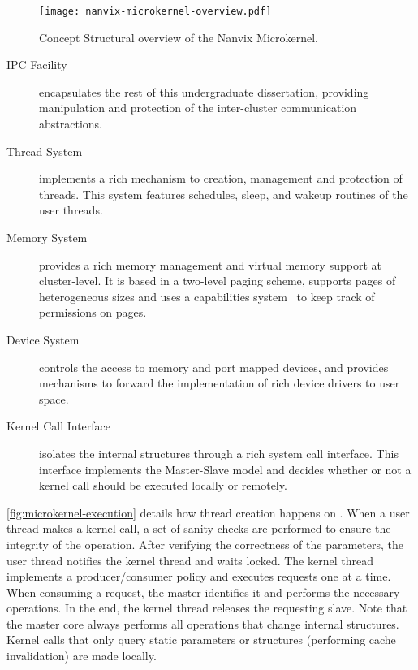 		\begin{figure}[!tb]
			\centering%
			\caption{Concept Structural overview of the Nanvix Microkernel.}%
			\label{fig:microkernel-overview}%
			\texttt{[image: nanvix-microkernel-overview.pdf]}%
		\end{figure}

		\begin{description}

			\item[IPC Facility]
				encapsulates the rest of this undergraduate dissertation, providing
				manipulation and protection of the inter-cluster communication abstractions.
				
			\item[Thread System]
				implements a rich mechanism to creation, management and protection of threads.
				This system features schedules, sleep, and wakeup routines of the user threads.
				
			\item[Memory System]
				provides a rich memory management and virtual memory support at cluster-level.
				It is based in a two-level paging scheme, supports pages of heterogeneous sizes
				and uses a capabilities system~\cite{Baumann2009} to keep track of permissions on pages.

			\item[Device System]
				controls the access to memory and port mapped devices, and provides
				mechanisms to forward the implementation of rich device drivers to user space.

			\item[Kernel Call Interface]
				isolates the \microkernel internal structures through a rich system call interface.
				This interface implements the Master-Slave \os model
				and decides whether or not a kernel call should be executed locally or remotely.

		\end{description}

		\autoref{fig:microkernel-execution} details how thread creation
		happens on \nanvix \microkernel.
		When a user thread makes a kernel call, a set of sanity checks are performed
		to ensure the integrity of the operation.
		After verifying the correctness of the parameters, the user thread notifies
		the kernel thread and waits locked.
		The kernel thread implements a producer/consumer policy and executes requests
		one at a time.
		When consuming a request, the master identifies it and performs the necessary operations.
		In the end, the kernel thread releases the requesting slave.
		Note that the master core always performs all operations that change internal
		\os structures.
		Kernel calls that only query static parameters or structures (performing cache invalidation) are made locally.

